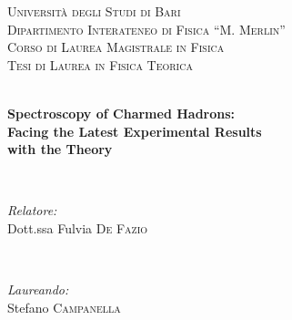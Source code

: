 
\thispagestyle{empty}

\begingroup
\center %


\textsc{\LARGE Università degli Studi di Bari}\\[1.5cm]
\textsc{\Large Dipartimento Interateneo di Fisica ``M. Merlin''}\\[0.5cm]
\textsc{\large Corso di Laurea Magistrale in Fisica}\\[0.5cm]
\textsc{\large Tesi di Laurea in Fisica Teorica}\\[0.5cm]


\HRule \\[0.4cm]
{ \huge 
  \bfseries Spectroscopy of Charmed Hadrons: \\ Facing the Latest Experimental Results \\ with the Theory \par
}
\HRule \\[1.5cm]


\begin{minipage}{0.4\textwidth}
\begin{flushleft} \large
\emph{Relatore:} \\
Dott.ssa Fulvia \textsc{De Fazio}\\
\end{flushleft}
\end{minipage}
~
\begin{minipage}{0.4\textwidth}
\begin{flushright} \large
\emph{Laureando:}\\
Stefano \textsc{Campanella}
\end{flushright}
\end{minipage}\\[4cm]


